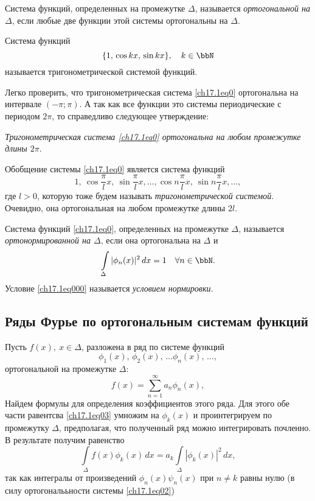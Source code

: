 \begin{defn}
Система функций, определенных на промежутке $\Delta$, называется \textit{ортогональной на $\Delta$}, если любые две функции этой системы ортогональны на $\Delta$.
\end{defn}

\begin{defn}
Система функций 
\begin{equation} \label{ch17.1eq0}
\{1,\, \cos kx,\, \sin kx\}, \quad k\in \bbN
\end{equation}
называется тригонометрической системой функций.			
\end{defn}
Легко проверить, что тригонометрическая система \eqref{ch17.1eq0} ортогональна на интервале $(-\pi;\pi)$. А так как все функции это системы периодические с периодом $2\pi$, то справедливо следующее утверждение:

\textit{Тригонометрическая система \eqref{ch17.1eq0} ортогональна на любом промежутке длины $2\pi$}.	

Обобщение системы \eqref{ch17.1eq0} является система функций
$$
1,\ \cos \frac{\pi}{l}x,\ \sin \frac{\pi}{l}x,\ldots,\cos n\frac{\pi}{l}x,\ \sin n\frac{\pi}{l}x,\ldots,
$$
где $l>0$, которую тоже будем называть \textit{тригонометрической системой}. Очевидно, она ортогональная на любом промежутке длины $2l$.
\begin{defn}
Система функций \eqref{ch17.1eq0}, определенных на промежутке $\Delta$, называется \textit{ортонормированной на $\Delta$}, если она ортогональна на $\Delta$ и 
\begin{equation} \label{ch17.1eq000}
\int \limits_\Delta{|\phi_n(x)|^2\,dx=1} \quad \forall n \in \bbN.
\end{equation}
Условие \eqref{ch17.1eq000} называется \textit{условием нормировки.}
\end{defn}

\subsection{Ряды Фурье по ортогональным системам функций}

Пусть $f(x),\ x \in \Delta$, разложена в ряд по системе функций
\begin{equation} \label{ch17.1eq02}
\phi_1(x), \,\phi_2(x), \, \ldots \phi_n(x), \,\ldots,
\end{equation}
ортогональной на промежутке $\Delta$:
\begin{equation} \label{ch17.1eq03}
f(x)= \sum_{n = 1}^{\infty} a_n \phi_n(x),
\end{equation}
Найдем формулы для определения коэффициентов этого ряда. Для этого обе части равентсва \eqref{ch17.1eq03} умножим на $\phi_k(x)$ и проинтегрируем по промежутку $\Delta$, предполагая, что полученный ряд можно интегрировать почленно. В результате получим равенство
$$
\int \limits_\Delta{f(x) \phi_k(x)}\,dx=a_k\int \limits_\Delta|\phi_k(x)|^2\,dx,
$$
так как интегралы от произведений $\phi_n(x)\psi_n(x)$ при $n\ne k$ равны нулю (в силу ортогональьности системы \eqref{ch17.1eq02})

